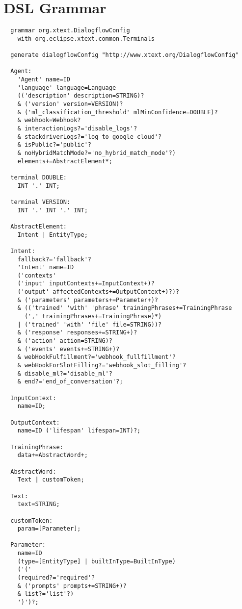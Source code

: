 \chapter{DSL Grammar}

\begin{lstlisting}
  grammar org.xtext.DialogflowConfig 
    with org.eclipse.xtext.common.Terminals

  generate dialogflowConfig "http://www.xtext.org/DialogflowConfig"
  
  Agent:
    'Agent' name=ID
    'language' language=Language
    (('description' description=STRING)?
    & ('version' version=VERSION)?
    & ('ml_classification_threshold' mlMinConfidence=DOUBLE)?
    & webhook=Webhook?
    & interactionLogs?='disable_logs'?
    & stackdriverLogs?='log_to_google_cloud'?
    & isPublic?='public'?
    & noHybridMatchMode?='no_hybrid_match_mode'?)
    elements+=AbstractElement*;
  
  terminal DOUBLE:
    INT '.' INT;
  
  terminal VERSION:
    INT '.' INT '.' INT;
  
  AbstractElement:
    Intent | EntityType;
  
  Intent:
    fallback?='fallback'?
    'Intent' name=ID
    ('contexts'
    ('input' inputContexts+=InputContext+)?
    ('output' affectedContexts+=OutputContext+)?)?
    & ('parameters' parameters+=Parameter+)?
    & (('trained' 'with' 'phrase' trainingPhrases+=TrainingPhrase 
      (',' trainingPhrases+=TrainingPhrase)*)
    | ('trained' 'with' 'file' file=STRING))?
    & ('response' responses+=STRING+)?
    & ('action' action=STRING)?
    & ('events' events+=STRING+)?
    & webHookFulfillment?='webhook_fullfillment'?
    & webHookForSlotFilling?='webhook_slot_filling'?
    & disable_ml?='disable_ml'?
    & end?='end_of_conversation'?;
  
  InputContext:
    name=ID;
  
  OutputContext:
    name=ID ('lifespan' lifespan=INT)?;
  
  TrainingPhrase:
    data+=AbstractWord+;
  
  AbstractWord:
    Text | customToken;
  
  Text:
    text=STRING;
  
  customToken:
    param=[Parameter];
  
  Parameter:
    name=ID
    (type=[EntityType] | builtInType=BuiltInType)
    ('('
    (required?='required'? 
    & ('prompts' prompts+=STRING+)? 
    & list?='list'?)
    ')')?;
  

\end{lstlisting}
